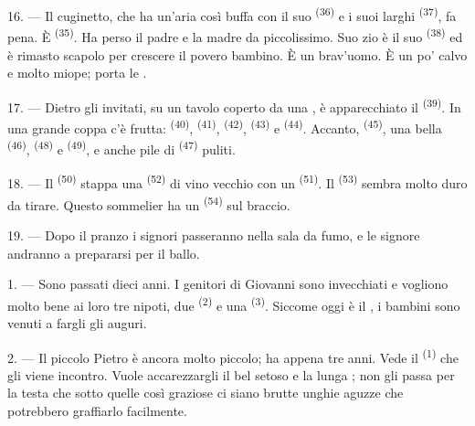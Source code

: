 16. --- Il cuginetto, che ha un'aria così buffa con il suo 
\textsuperscript{(36)} e i suoi  larghi \textsuperscript{(37)}, fa
pena. È  \textsuperscript{(35)}. Ha perso il padre e la madre da
piccolissimo. Suo zio è il suo  \textsuperscript{(38)} ed è rimasto
scapolo per crescere il povero bambino. È un brav'uomo. È un po' calvo e molto
miope; porta le .

\VUsaut{2.4mm}
\VUsaut{3.0mm}

17. --- Dietro gli invitati, su un tavolo coperto da una , è
apparecchiato il  \textsuperscript{(39)}. In una grande coppa c'è
frutta:  \textsuperscript{(40)},  \textsuperscript{(41)},
 \textsuperscript{(42)},  \textsuperscript{(43)} e
 \textsuperscript{(44)}. Accanto, 
\textsuperscript{(45)}, una bella  \textsuperscript{(46)},
 \textsuperscript{(48)} e 
\textsuperscript{(49)}, e anche pile di  \textsuperscript{(47)} puliti.

18. --- Il  \textsuperscript{(50)} stappa una 
\textsuperscript{(52)} di vino vecchio con un 
\textsuperscript{(51)}. Il  \textsuperscript{(53)} sembra molto duro da
tirare. Questo sommelier ha un  \textsuperscript{(54)} sul braccio.

19. --- Dopo il pranzo i signori passeranno nella sala da fumo, e le signore andranno a
prepararsi per il ballo.

\VUsaut{5.0mm}
\VUsaut{1.6mm}
\VUsaut{2.6mm}

\VUsaut{3.0mm}

1. --- Sono passati dieci anni. I genitori di Giovanni sono invecchiati e vogliono
molto bene ai loro tre nipoti, due  \textsuperscript{(2)} e una
 \textsuperscript{(3)}. Siccome oggi è il ,
i bambini sono venuti a fargli gli auguri.

2. --- Il piccolo Pietro è ancora molto piccolo; ha appena tre anni. Vede il
 \textsuperscript{(1)} che gli viene incontro. Vuole accarezzargli il bel
 setoso e la lunga ; non gli passa per la testa che sotto
quelle  così graziose ci siano brutte unghie aguzze che potrebbero
graffiarlo facilmente.


